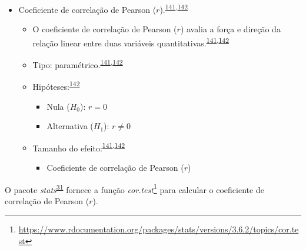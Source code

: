 \documentclass[
  a4paper,
]{book}
\providecommand{\tightlist}{%
  \setlength{\itemsep}{0pt}\setlength{\parskip}{0pt}}
\renewcommand{\href}[2]{#2\footnote{\url{#1}}}
\newenvironment{infobox}[1]
  {
  \begin{itemize}
  \renewcommand{\labelitemi}{
    \raisebox{-.7\height}[0pt][0pt]{
      {\setkeys{Gin}{width=3em,keepaspectratio}
        \texttt{[image: \#1]}}
    }
  }
  \setlength{\fboxsep}{1em}
  \begin{blackbox}
  \item
  }
  {
  \end{blackbox}
  \end{itemize}
  }
\begin{document}
\begin{itemize}
\item
  Coeficiente de correlação de Pearson (\(r\)).\textsuperscript{\protect\hyperlink{ref-khamis2008}{141},\protect\hyperlink{ref-allison2022}{142}}

  \begin{itemize}
  \item
    O coeficiente de correlação de Pearson (\(r\)) avalia a força e direção da relação linear entre duas variáveis quantitativas.\textsuperscript{\protect\hyperlink{ref-khamis2008}{141},\protect\hyperlink{ref-allison2022}{142}}
  \item
    Tipo: paramétrico.\textsuperscript{\protect\hyperlink{ref-khamis2008}{141},\protect\hyperlink{ref-allison2022}{142}}
  \item
    Hipóteses:\textsuperscript{\protect\hyperlink{ref-allison2022}{142}}

    \begin{itemize}
    \item
      Nula (\(H_{0}\)): \(r=0\)
    \item
      Alternativa (\(H_{1}\)): \(r≠0\)
    \end{itemize}
  \item
    Tamanho do efeito:\textsuperscript{\protect\hyperlink{ref-khamis2008}{141},\protect\hyperlink{ref-allison2022}{142}}

    \begin{itemize}
    \tightlist
    \item
      Coeficiente de correlação de Pearson (\(r\))
    \end{itemize}
  \end{itemize}
\end{itemize}

\begin{infobox}{images/Rlogo}
O pacote \emph{stats}\textsuperscript{\protect\hyperlink{ref-stats-2}{31}} fornece a função \href{https://www.rdocumentation.org/packages/stats/versions/3.6.2/topics/cor.test}{\emph{cor.test}} para calcular o coeficiente de correlação de Pearson (\(r\)).

\end{infobox}
\end{document}

